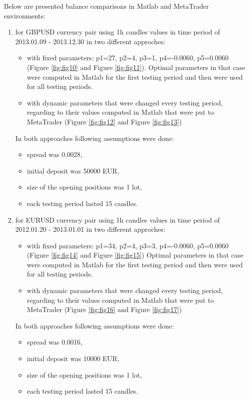 \documentclass[runningheads,a4paper]{llncs}
\begin{document}
Below are presented balance comparisons in Matlab and MetaTrader environments:
\begin{enumerate}
\item for GBPUSD currency pair using 1h candles values in time period of 2013.01.09 - 2013.12.30 in two different approches:
\begin{itemize}
\item with fixed parameters: p1=27, p2=4, p3=1, p4=-0.0060, p5=0.0060 (Figure \ref{fig:fig10} and Figure \ref{fig:fig11}). Optimal parameters in that case were computed in Matlab for the first testing period and then were used for all testing periods.
\item with dynamic parameters that were changed every testing period, regarding to their values computed in Matlab that were put to MetaTrader (Figure \ref{fig:fig12} and Figure \ref{fig:fig13})
\end{itemize}
In both approaches following assumptions were done:
\begin{itemize}
\item spread was 0.0028, 
\item initial deposit was 50000 EUR,
\item size of the opening positions was 1 lot,
\item each testing period lasted 15 candles.
\end{itemize}
\item for EURUSD currency pair using 1h candles values in time period of 2012.01.20 - 2013.01.01 in two different approches:
\begin{itemize}
\item with fixed parameters: p1=34, p2=4, p3=3, p4=-0.0060, p5=0.0060 (Figure \ref{fig:fig14} and Figure \ref{fig:fig15}) Optimal parameters in that case were computed in Matlab for the first testing period and then were used for all testing periods.
\item with dynamic parameters that were changed every testing period, regarding to their values computed in Matlab that were put to MetaTrader (Figure \ref{fig:fig16} and Figure \ref{fig:fig17})
\end{itemize}
In both approaches following assumptions were done:
\begin{itemize}
\item spread was 0.0016, 
\item initial deposit was 10000 EUR,
\item size of the opening positions was 1 lot,
\item each testing period lasted 15 candles.
\end{itemize}
\end{enumerate}
\end{document}
